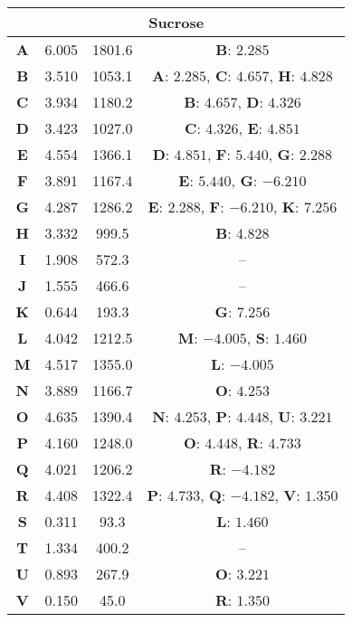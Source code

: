 \begin{longtable}[h!]{c c c c}
\hline
\multicolumn{4}{c}{\textbf{Sucrose}}\\
\hline
\textbf{A} & 6.005 & 1801.6 & \textbf{B}: $2.285$ \\
\textbf{B} & 3.510 & 1053.1 & \textbf{A}: $2.285$, \textbf{C}: $4.657$, \textbf{H}: $4.828$ \\
\textbf{C} & 3.934 & 1180.2 & \textbf{B}: $4.657$, \textbf{D}: $4.326$ \\
\textbf{D} & 3.423 & 1027.0 & \textbf{C}: $4.326$, \textbf{E}: $4.851$ \\
\textbf{E} & 4.554 & 1366.1 & \textbf{D}: $4.851$, \textbf{F}: $5.440$, \textbf{G}: $2.288$ \\
\textbf{F} & 3.891 & 1167.4 & \textbf{E}: $5.440$, \textbf{G}: $-6.210$ \\
\textbf{G} & 4.287 & 1286.2 & \textbf{E}: $2.288$, \textbf{F}: $-6.210$, \textbf{K}: $7.256$ \\
\textbf{H} & 3.332 & 999.5 & \textbf{B}: $4.828$ \\
\textbf{I} & 1.908 & 572.3 & -- \\
\textbf{J} & 1.555 & 466.6 & -- \\
\textbf{K} & 0.644 & 193.3 & \textbf{G}: $7.256$ \\
\textbf{L} & 4.042 & 1212.5 & \textbf{M}: $-4.005$, \textbf{S}: $1.460$ \\
\textbf{M} & 4.517 & 1355.0 & \textbf{L}: $-4.005$ \\
\textbf{N} & 3.889 & 1166.7 & \textbf{O}: $4.253$ \\
\textbf{O} & 4.635 & 1390.4 & \textbf{N}: $4.253$, \textbf{P}: $4.448$, \textbf{U}: $3.221$ \\
\textbf{P} & 4.160 & 1248.0 & \textbf{O}: $4.448$, \textbf{R}: $4.733$ \\
\textbf{Q} & 4.021 & 1206.2 & \textbf{R}: $-4.182$ \\
\textbf{R} & 4.408 & 1322.4 & \textbf{P}: $4.733$, \textbf{Q}: $-4.182$, \textbf{V}: $1.350$ \\
\textbf{S} & 0.311 & 93.3 & \textbf{L}: $1.460$ \\
\textbf{T} & 1.334 & 400.2 & -- \\
\textbf{U} & 0.893 & 267.9 & \textbf{O}: $3.221$ \\
\textbf{V} & 0.150 & 45.0 & \textbf{R}: $1.350$ \\

\hline
\end{longtable}
